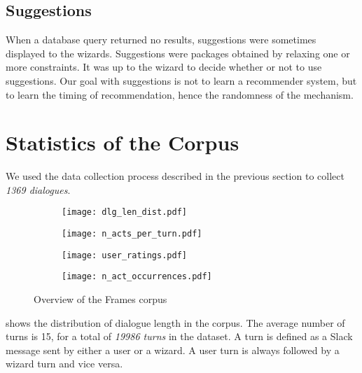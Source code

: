\documentclass{article}
\theoremstyle{definition}
\newcommand{\ndialogues}{1369}
\begin{document}
\subsection{Suggestions}
When a database query returned no results, suggestions were sometimes displayed to the wizards. Suggestions were packages obtained by relaxing one or more constraints. It was up to the wizard to decide whether or not to use suggestions. Our goal with suggestions is not to learn a recommender system, but to learn the timing of recommendation, hence the randomness of the mechanism.

\section{Statistics of the Corpus}
\label{corpus_characteristics}
We used the data collection process described in the previous section to collect \emph{\ndialogues{} dialogues}. 
\begin{figure}
	\begin{center}
    \begin{subfigure}[b]{0.40\textwidth}
        \texttt{[image: dlg\_len\_dist.pdf]}
        \caption{}
        \label{fig:turns}
        \vspace{0.2cm}
    \end{subfigure}
    \begin{subfigure}[b]{0.40\textwidth}
        \texttt{[image: n\_acts\_per\_turn.pdf]}
        \caption{}
        \label{fig:nb_acts}
        \vspace{0.2cm}
    \end{subfigure}
    \begin{subfigure}[b]{0.40\textwidth}
        \texttt{[image: user\_ratings.pdf]}
        \caption{}
        \label{fig:u_ratings}
    \end{subfigure}
    \begin{subfigure}[b]{0.40\textwidth}
        \texttt{[image: n\_act\_occurrences.pdf]}
        \caption{}
        \label{fig:act_occurrences}
    \end{subfigure}
    \caption{Overview of the Frames corpus}
    \label{fig:global_stats}
    \end{center}
\end{figure}
 shows the distribution of dialogue length in the corpus. The average number of turns is 15, for a total of \emph{19986 turns} in the dataset. A turn is defined as a Slack message sent by either a user or a wizard. A user turn is always followed by a wizard turn and vice versa.
\end{document}
